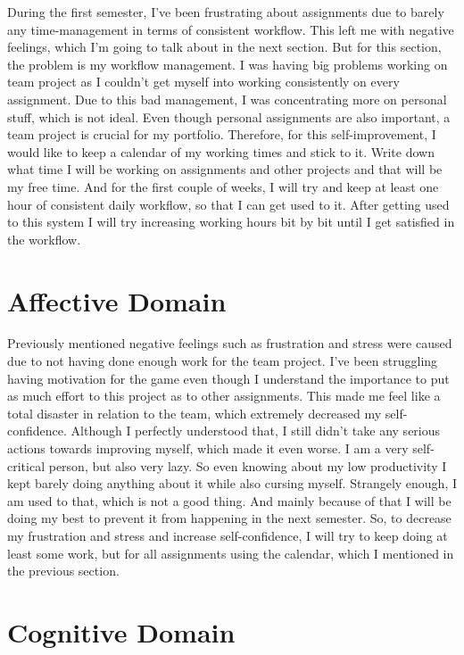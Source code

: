 \documentclass{scrartcl}
\begin{document}
During the first semester, I've been frustrating about assignments due to barely any time-management in terms of consistent workflow. This left me with negative feelings, which I'm going to talk about in the next section. But for this section, the problem is my workflow management. I was having big problems working on team project as I couldn't get myself into working consistently on every assignment. Due to this bad management, I was concentrating more on personal stuff, which is not ideal. Even though personal assignments are also important, a team project is crucial for my portfolio. Therefore, for this self-improvement, I would like to keep a calendar of my working times and stick to it. Write down what time I will be working on assignments and other projects and that will be my free time. And for the first couple of weeks, I will try and keep at least one hour of consistent daily workflow, so that I can get used to it. After getting used to this system I will try increasing working hours bit by bit until I get satisfied in the workflow.

\section{Affective Domain}

Previously mentioned negative feelings such as frustration and stress were caused due to not having done enough work for the team project. I've been struggling having motivation for the game even though I understand the importance to put as much effort to this project as to other assignments. This made me feel like a total disaster in relation to the team, which extremely decreased my self-confidence. Although I perfectly understood that, I still didn't take any serious actions towards improving myself, which made it even worse. I am a very self-critical person, but also very lazy. So even knowing about my low productivity I kept barely doing anything about it while also cursing myself. Strangely enough, I am used to that, which is not a good thing. And mainly because of that I will be doing my best to prevent it from happening in the next semester. So, to decrease my frustration and stress and increase self-confidence, I will try to keep doing at least some work, but for all assignments using the calendar, which I mentioned in the previous section.

\section{Cognitive Domain}
\end{document}
